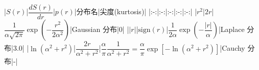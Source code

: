 |$S(r)$|$\dfrac{dS(r)}{dr}$|$p(r)$|分布名|尖度(kurtosis)|
|:-:|:-:|:-:|:-:|:-:|
|$r^2$|$2r$|$\dfrac{1}{\alpha \sqrt{2\pi}}\exp\left(-\dfrac{r^2}{2\alpha^2}\right)$|Gaussian 分布|0|
|$\vert r\vert$|$\text{sign}(r)$|$\dfrac{1}{2\alpha}\exp\left(-\dfrac{\vert r\vert}{\alpha}\right)$|Laplace 分布|3.0|
|$\ln (\alpha^2+r^2)$|$\dfrac{2r}{\alpha^2+r^2}$|$\dfrac{\alpha}{\pi}\dfrac{1}{\alpha^2+r^2}=\dfrac{\alpha}{\pi}\exp[-\ln (\alpha^2+r^2)]$|Cauchy 分布|-|